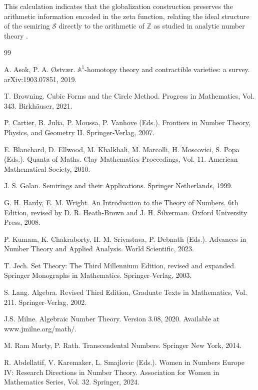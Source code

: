 \documentclass[11pt, a4paper]{article}
\theoremstyle{plain}
\theoremstyle{definition}
\numberwithin{equation}{section}
\newcommand{\Z}{\mathbb{Z}}
\newcommand{\SemiringS}{\mathcal{S}}
\begin{document}
This calculation indicates that the globalization construction preserves the arithmetic information encoded in the zeta function, relating the ideal structure of the semiring $\SemiringS$ directly to the arithmetic of $\Z$ as studied in analytic number theory \cite{HardyWright}.

\begin{thebibliography}{99}

 A. Asok, P. A. Østvær. $\mathbb{A}^1$-homotopy theory and contractible varieties: a survey. arXiv:1903.07851, 2019.

 T. Browning. Cubic Forms and the Circle Method. Progress in Mathematics, Vol. 343. Birkhäuser, 2021.

 P. Cartier, B. Julia, P. Moussa, P. Vanhove (Eds.). Frontiers in Number Theory, Physics, and Geometry II. Springer-Verlag, 2007.

 E. Blanchard, D. Ellwood, M. Khalkhali, M. Marcolli, H. Moscovici, S. Popa (Eds.). Quanta of Maths. Clay Mathematics Proceedings, Vol. 11. American Mathematical Society, 2010.

 J. S. Golan. Semirings and their Applications. Springer Netherlands, 1999.

 G. H. Hardy, E. M. Wright. An Introduction to the Theory of Numbers. 6th Edition, revised by D. R. Heath-Brown and J. H. Silverman. Oxford University Press, 2008.

 P. Kumam, K. Chakraborty, H. M. Srivastava, P. Debnath (Eds.). Advances in Number Theory and Applied Analysis. World Scientific, 2023.

 T. Jech. Set Theory: The Third Millennium Edition, revised and expanded. Springer Monographs in Mathematics. Springer-Verlag, 2003.

 S. Lang. Algebra. Revised Third Edition, Graduate Texts in Mathematics, Vol. 211. Springer-Verlag, 2002.

 J.S. Milne. Algebraic Number Theory. Version 3.08, 2020. Available at www.jmilne.org/math/.

 M. Ram Murty, P. Rath. Transcendental Numbers. Springer New York, 2014.

 R. Abdellatif, V. Karemaker, L. Smajlovic (Eds.). Women in Numbers Europe IV: Research Directions in Number Theory. Association for Women in Mathematics Series, Vol. 32. Springer, 2024.

\end{thebibliography}
\end{document}
